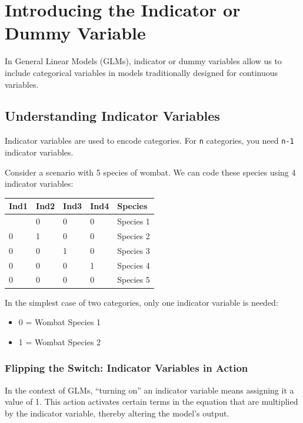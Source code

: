 \documentclass[
  letterpaper,
  DIV=11,
  numbers=noendperiod]{scrreprt}
\providecommand{\tightlist}{%
  \setlength{\itemsep}{0pt}\setlength{\parskip}{0pt}}
\begin{document}
\section{Introducing the Indicator or Dummy
Variable}\label{introducing-the-indicator-or-dummy-variable}

In General Linear Models (GLMs), indicator or dummy variables allow us
to include categorical variables in models traditionally designed for
continuous variables.

\subsection{Understanding Indicator
Variables}\label{understanding-indicator-variables}

Indicator variables are used to encode categories. For \texttt{n}
categories, you need \texttt{n-1} indicator variables.

Consider a scenario with 5 species of wombat. We can code these species
using 4 indicator variables:

\begin{longtable}[]{@{}lllll@{}}
\toprule\noalign{}
Ind1 & Ind2 & Ind3 & Ind4 & Species \\
\midrule\noalign{}
\endhead
\bottomrule\noalign{}
\endlastfoot
1 & 0 & 0 & 0 & Species 1 \\
0 & 1 & 0 & 0 & Species 2 \\
0 & 0 & 1 & 0 & Species 3 \\
0 & 0 & 0 & 1 & Species 4 \\
0 & 0 & 0 & 0 & Species 5 \\
\end{longtable}

In the simplest case of two categories, only one indicator variable is
needed:

\begin{itemize}
\tightlist
\item
  0 = Wombat Species 1
\item
  1 = Wombat Species 2
\end{itemize}

\subsubsection{Flipping the Switch: Indicator Variables in
Action}\label{flipping-the-switch-indicator-variables-in-action}

In the context of GLMs, ``turning on'' an indicator variable means
assigning it a value of 1. This action activates certain terms in the
equation that are multiplied by the indicator variable, thereby altering
the model's output.
\end{document}
